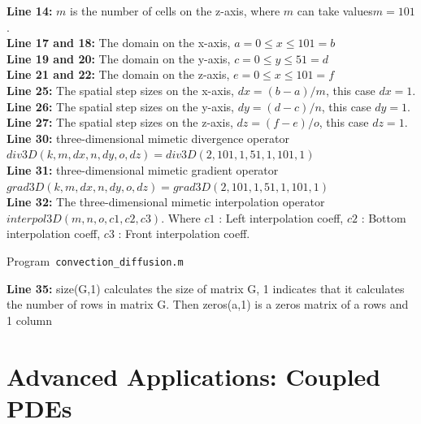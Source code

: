 \textbf{Line 14:} $m$ is the number of cells on the z-axis, where $m$ can take values ​​$m= 101$.\\

\textbf{Line 17 and 18:} The domain on the  x-axis, $a=0 \leq x \leq 101=b$\\

\textbf{Line 19 and 20:} The domain on the  y-axis, $c=0 \leq y \leq 51=d$\\

\textbf{Line 21 and 22:} The domain on the  z-axis, $e=0 \leq x \leq 101=f$\\

\textbf{Line 25:} The spatial step sizes on the x-axis, $ dx = (b-a)/m$, this case $dx = 1$.\\

\textbf{Line 26:} The spatial step sizes on the y-axis, $ dy = (d-c)/n$, this case $dy = 1$.\\

\textbf{Line 27:} The spatial step sizes on the z-axis, $ dz = (f-e)/o$, this case $dz = 1$.\\

\textbf{Line 30:} three-dimensional mimetic divergence operator $div3D(k,m,dx,n,dy,o,dz)=div3D(2,101,1,51,1,101,1)$\\

\textbf{Line 31:} three-dimensional mimetic gradient operator $grad3D(k,m,dx,n,dy,o,dz)=grad3D(2,101,1,51,1,101,1)$\\

\textbf{Line 32:} The three-dimensional mimetic interpolation operator
 $interpol3D(m, n, o, c1, c2, c3)$.  Where $c1$ : Left interpolation coeff, $c2$ : Bottom interpolation coeff, $c3$ : Front interpolation coeff.\\

\begin{listing}[ht!]
    \tiny
    \centering
    \caption{Program~\texttt{convection\_diffusion.m}}
    \label{code:convection_diffusion.m}
\end{listing}

\textbf{Line 35:} size(G,1) calculates the size of matrix G, 1 indicates that it calculates the number of rows in matrix G. Then zeros(a,1) is a zeros matrix of a rows and 1 column







\section{Advanced Applications: Coupled PDEs}

